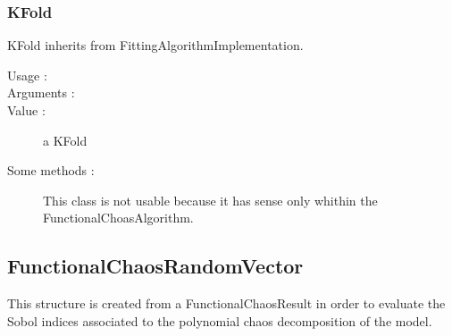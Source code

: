 \subsubsection{KFold}
      KFold inherits from FittingAlgorithmImplementation.

      \begin{description}
         \item[Usage :] \strut

         \item[Arguments :]  \strut

         \item[Value :] a KFold

         \item[Some methods :]  This class is not usable because it has sense only whithin the FunctionalChoasAlgorithm.

      \end{description}





\newpage \subsection{FunctionalChaosRandomVector}

This structure is created from a FunctionalChaosResult in order to evaluate the Sobol indices associated to the polynomial chaos decomposition of the model.

